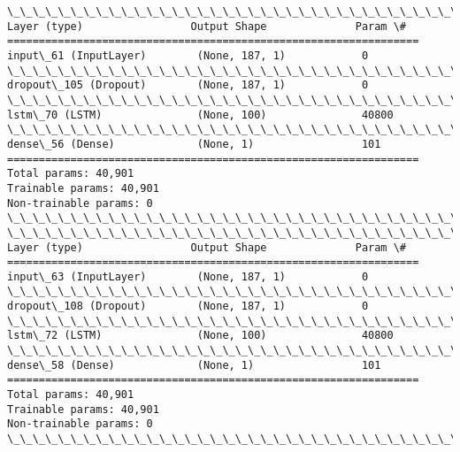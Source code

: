 \documentclass[11pt]{article}
\begin{document}
    \begin{Verbatim}[commandchars=\\\{\}]
\_\_\_\_\_\_\_\_\_\_\_\_\_\_\_\_\_\_\_\_\_\_\_\_\_\_\_\_\_\_\_\_\_\_\_\_\_\_\_\_\_\_\_\_\_\_\_\_\_\_\_\_\_\_\_\_\_\_\_\_\_\_\_\_\_
Layer (type)                 Output Shape              Param \#   
=================================================================
input\_61 (InputLayer)        (None, 187, 1)            0         
\_\_\_\_\_\_\_\_\_\_\_\_\_\_\_\_\_\_\_\_\_\_\_\_\_\_\_\_\_\_\_\_\_\_\_\_\_\_\_\_\_\_\_\_\_\_\_\_\_\_\_\_\_\_\_\_\_\_\_\_\_\_\_\_\_
dropout\_105 (Dropout)        (None, 187, 1)            0         
\_\_\_\_\_\_\_\_\_\_\_\_\_\_\_\_\_\_\_\_\_\_\_\_\_\_\_\_\_\_\_\_\_\_\_\_\_\_\_\_\_\_\_\_\_\_\_\_\_\_\_\_\_\_\_\_\_\_\_\_\_\_\_\_\_
lstm\_70 (LSTM)               (None, 100)               40800     
\_\_\_\_\_\_\_\_\_\_\_\_\_\_\_\_\_\_\_\_\_\_\_\_\_\_\_\_\_\_\_\_\_\_\_\_\_\_\_\_\_\_\_\_\_\_\_\_\_\_\_\_\_\_\_\_\_\_\_\_\_\_\_\_\_
dense\_56 (Dense)             (None, 1)                 101       
=================================================================
Total params: 40,901
Trainable params: 40,901
Non-trainable params: 0
\_\_\_\_\_\_\_\_\_\_\_\_\_\_\_\_\_\_\_\_\_\_\_\_\_\_\_\_\_\_\_\_\_\_\_\_\_\_\_\_\_\_\_\_\_\_\_\_\_\_\_\_\_\_\_\_\_\_\_\_\_\_\_\_\_
\_\_\_\_\_\_\_\_\_\_\_\_\_\_\_\_\_\_\_\_\_\_\_\_\_\_\_\_\_\_\_\_\_\_\_\_\_\_\_\_\_\_\_\_\_\_\_\_\_\_\_\_\_\_\_\_\_\_\_\_\_\_\_\_\_
Layer (type)                 Output Shape              Param \#   
=================================================================
input\_63 (InputLayer)        (None, 187, 1)            0         
\_\_\_\_\_\_\_\_\_\_\_\_\_\_\_\_\_\_\_\_\_\_\_\_\_\_\_\_\_\_\_\_\_\_\_\_\_\_\_\_\_\_\_\_\_\_\_\_\_\_\_\_\_\_\_\_\_\_\_\_\_\_\_\_\_
dropout\_108 (Dropout)        (None, 187, 1)            0         
\_\_\_\_\_\_\_\_\_\_\_\_\_\_\_\_\_\_\_\_\_\_\_\_\_\_\_\_\_\_\_\_\_\_\_\_\_\_\_\_\_\_\_\_\_\_\_\_\_\_\_\_\_\_\_\_\_\_\_\_\_\_\_\_\_
lstm\_72 (LSTM)               (None, 100)               40800     
\_\_\_\_\_\_\_\_\_\_\_\_\_\_\_\_\_\_\_\_\_\_\_\_\_\_\_\_\_\_\_\_\_\_\_\_\_\_\_\_\_\_\_\_\_\_\_\_\_\_\_\_\_\_\_\_\_\_\_\_\_\_\_\_\_
dense\_58 (Dense)             (None, 1)                 101       
=================================================================
Total params: 40,901
Trainable params: 40,901
Non-trainable params: 0
\_\_\_\_\_\_\_\_\_\_\_\_\_\_\_\_\_\_\_\_\_\_\_\_\_\_\_\_\_\_\_\_\_\_\_\_\_\_\_\_\_\_\_\_\_\_\_\_\_\_\_\_\_\_\_\_\_\_\_\_\_\_\_\_\_

    \end{Verbatim}
\end{document}
